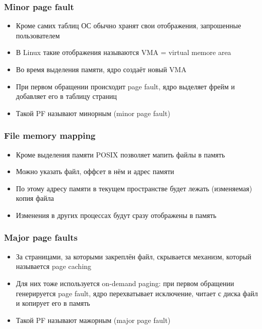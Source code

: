     \subsubsection{Minor page fault}
      \begin{itemize}
        \item Кроме самих таблиц ОС обычно хранят свои отображения, запрошенные пользователем
        \item В Linux такие отображения называются VMA = virtual memore area
        \item Во время выделения памяти, ядро создаёт новый VMA
        \item При первом обращении происходит page fault, ядро выделяет фрейм и добавляет его в таблицу страниц
        \item Такой PF называют минорным (minor page fault)
      \end{itemize}
    
    \subsubsection{File memory mapping}
      \begin{itemize}
        \item Кроме выделения памяти POSIX позволяет мапить файлы в память
        \item Можно указать файл, оффсет в нём и адрес памяти
        \item По этому адресу памяти в текущем пространстве будет лежать (изменяемая) копия файла
        \item Изменения в других процессах будут сразу отображены в память
      \end{itemize}
    
    \subsubsection{Major page faults}
      \begin{itemize}
        \item За страницами, за которыми закреплён файл, скрывается механизм, который называется page caching
        \item Для них тоже используется on-demand paging: при первом обращении генерируется page fault, ядро перехватывает исключение, читает с диска файл и копирует его в память
        \item Такой PF называют мажорным (major page fault)
      \end{itemize}
    
